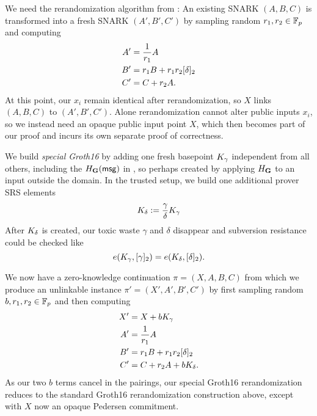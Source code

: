 We need the rerandomization algorithm from \cite[Fig.~1]{RandomizationGroth16}:
An existing SNARK $(A,B,C)$ is transformed into a fresh
SNARK $(A',B',C')$ by sampling random $r_1,r_2 \in \mathbb{F}_p$ and computing
$$ \begin{aligned}
A' &= {1 \over r_1} A \\
B' &= r_1 B + r_1 r_2 [\delta]_2 \\
C' &= C + r_2 A . \\
\end{aligned} $$
At this point, our $x_i$ remain identical after rerandomization,
so $X$ links $(A,B,C)$ to $(A',B',C')$.
Alone rerandomization cannot alter public inputs $x_i$, so
we instead need an opaque public input point $X$, which then becomes
part of our proof and incurs its own separate proof of correctness.

We build {\em special Groth16} by adding one fresh basepoint $K_\gamma$
independent from all others, including the $H_{{\mathbf{G}}}(\mathsf{msg})$ in \PedVRF, so
 perhaps created by applying $H_{\mathbf{G}}$ to an input outside the \msg domain.
In the trusted setup, we build one additional prover SRS elements
$$ K_\delta := {\gamma\over\delta} K_\gamma $$
After $K_\delta$ is created, our toxic waste $\gamma$ and $\delta$
disappear and subversion resistance could be checked like 
$$ e(K_\gamma, [\gamma]_2) = e(K_\delta, [\delta]_2) . $$

We now have a zero-knowledge continuation $\pi = (X,A,B,C)$ from which
we produce an unlinkable instance $\pi' = (X',A',B',C')$ by
 first sampling random $b,r_1,r_2 \in \mathbb{F}_p$ and then computing
$$ \begin{aligned}
X' &= X + b K_\gamma \\
A' &= {1 \over r_1} A \\
B' &= r_1 B + r_1 r_2 [\delta]_2 \\
C' &= C + r_2 A + b K_\delta . \\
\end{aligned} $$
As our two $b$ terms cancel in the pairings, our special Groth16
rerandomization reduces to the standard Groth16 rerandomization
construction above,
 except with $X$ now an opaque Pedersen commitment.

